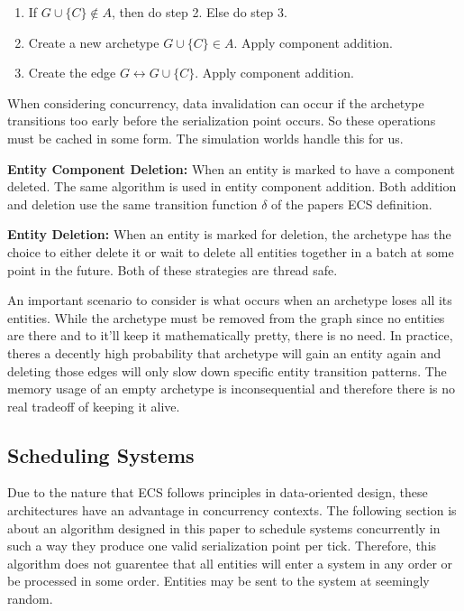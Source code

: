 \begin{enumerate}
    \item If $G \cup \{C\} \not\in A$, then do step 2. Else do step 3.
    \item Create a new archetype $G \cup \{C\} \in A$. Apply component addition.
    \item Create the edge $G \leftrightarrow G \cup \{C\}$. Apply component addition.
\end{enumerate}

When considering concurrency, data invalidation can occur if the archetype transitions too early before the serialization point occurs. So these operations must be cached in some form. The simulation worlds handle this for us.

\textbf{Entity Component Deletion: } When an entity is marked to have a component deleted. The same algorithm is used in entity component addition. Both addition and deletion use the same transition function $\delta$ of the papers ECS definition.  

\textbf{Entity Deletion: }
When an entity is marked for deletion, the archetype has the choice to either delete it or wait to delete all entities together in a batch at some point in the future. Both of these strategies are thread safe. 

An important scenario to consider is what occurs when an archetype loses all its entities. While the archetype must be removed from the graph since no entities are there and to it'll keep it mathematically pretty, there is no need. In practice, theres a decently high probability that archetype will gain an entity again and deleting those edges will only slow down specific entity transition patterns. The memory usage of an empty archetype is inconsequential and therefore there is no real tradeoff of keeping it alive.

\subsection{Scheduling Systems}
\label{sec:scheduling}

Due to the nature that ECS follows principles in data-oriented design, these architectures have an advantage in concurrency contexts. The following section is about an algorithm designed in this paper to schedule systems concurrently in such a way they produce one valid serialization point per tick. Therefore, this algorithm does not guarentee that all entities will enter a system in any order or be processed in some order. Entities may be sent to the system at seemingly random.

